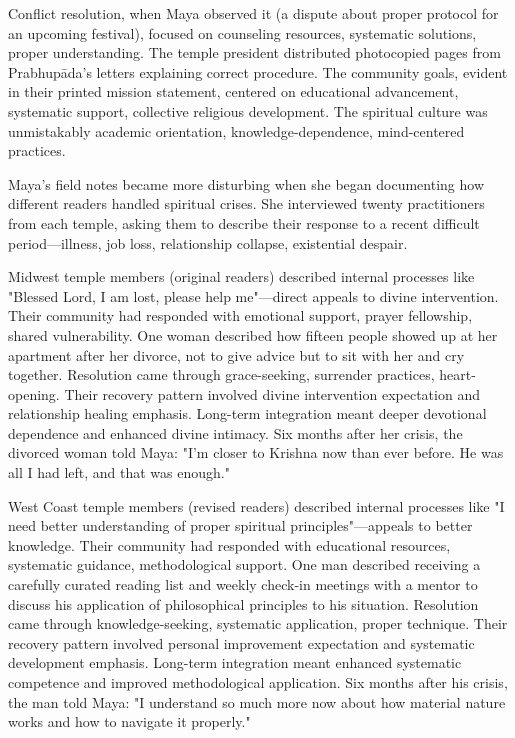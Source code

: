 \documentclass[12pt,twoside]{book}
\begin{document}
Conflict resolution, when Maya observed it (a dispute about proper protocol for an upcoming festival), focused on counseling resources, systematic solutions, proper understanding. The temple president distributed photocopied pages from Prabhupāda's letters explaining correct procedure. The community goals, evident in their printed mission statement, centered on educational advancement, systematic support, collective religious development. The spiritual culture was unmistakably academic orientation, knowledge-dependence, mind-centered practices.

Maya's field notes became more disturbing when she began documenting how different readers handled spiritual crises. She interviewed twenty practitioners from each temple, asking them to describe their response to a recent difficult period—illness, job loss, relationship collapse, existential despair.

Midwest temple members (original readers) described internal processes like "Blessed Lord, I am lost, please help me"—direct appeals to divine intervention. Their community had responded with emotional support, prayer fellowship, shared vulnerability. One woman described how fifteen people showed up at her apartment after her divorce, not to give advice but to sit with her and cry together. Resolution came through grace-seeking, surrender practices, heart-opening. Their recovery pattern involved divine intervention expectation and relationship healing emphasis. Long-term integration meant deeper devotional dependence and enhanced divine intimacy. Six months after her crisis, the divorced woman told Maya: "I'm closer to Krishna now than ever before. He was all I had left, and that was enough."

West Coast temple members (revised readers) described internal processes like "I need better understanding of proper spiritual principles"—appeals to better knowledge. Their community had responded with educational resources, systematic guidance, methodological support. One man described receiving a carefully curated reading list and weekly check-in meetings with a mentor to discuss his application of philosophical principles to his situation. Resolution came through knowledge-seeking, systematic application, proper technique. Their recovery pattern involved personal improvement expectation and systematic development emphasis. Long-term integration meant enhanced systematic competence and improved methodological application. Six months after his crisis, the man told Maya: "I understand so much more now about how material nature works and how to navigate it properly."
\end{document}
